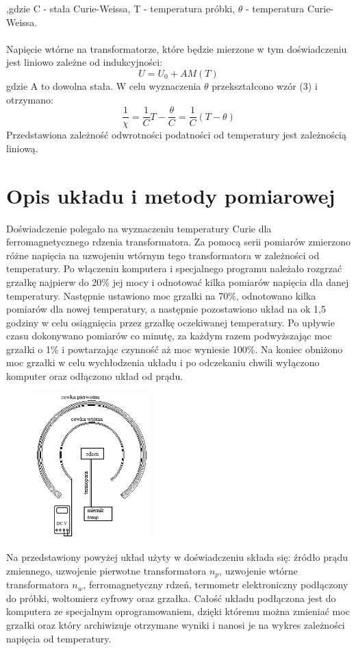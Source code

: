 \documentclass[a4paper,10pt]{article}
\begin{document}
,gdzie C - stała Curie-Weissa, T - temperatura próbki, $\theta$ - temperatura Curie-Weissa.
\\
\\Napięcie wtórne na transformatorze, które będzie mierzone w tym doświadczeniu jest liniowo zależne od indukcyjności:
\begin{equation}
U = U_0 + AM(T)
\end{equation}
gdzie A to dowolna stała. W celu wyznaczenia $\theta$ przekształcono wzór (3) i otrzymano:
\begin{equation}
\frac{1}{\chi} = \frac{1}{C} T - \frac{\theta}{C} = \frac{1}{C} (T-\theta)
\end{equation}
Przedstawiona zależność odwrotności podatności od temperatury jest zależnością liniową.

\section{Opis układu i metody pomiarowej}
Doświadczenie polegało na wyznaczeniu temperatury Curie dla ferromagnetycznego rdzenia transformatora. Za pomocą serii pomiarów zmierzono różne napięcia na uzwojeniu wtórnym tego transformatora w zależności od temperatury. Po włączeniu komputera i specjalnego programu należało rozgrzać grzałkę najpierw do 20\% jej mocy i odnotować kilka pomiarów napięcia dla danej temperatury. Następnie ustawiono moc grzałki na 70\%, odnotowano kilka pomiarów dla nowej temperatury, a następnie pozostawiono układ na ok 1,5 godziny w celu osiągnięcia przez grzałkę oczekiwanej temperatury. Po upływie czasu dokonywano pomiarów co minutę, za każdym razem podwyższając moc grzałki o 1\% i powtarzając czynność aż moc wyniesie 100\%. Na koniec obniżono moc grzałki w celu wychłodzenia układu i po odczekaniu chwili wyłączono komputer oraz odłączono układ od prądu.
\begin{figure}[H]
\center
\includegraphics[width=0.4\textwidth]{uklad.png}
\end{figure}
Na przedstawiony powyżej układ użyty w doświadczeniu składa się: źródło prądu zmiennego, uzwojenie pierwotne transformatora $n_p$, uzwojenie wtórne transformatora $n_w$, ferromagnetyczny rdzeń, termometr elektroniczny podłączony do próbki, woltomierz cyfrowy oraz grzałka. Całość układu podłączona jest do komputera ze specjalnym oprogramowaniem, dzięki któremu można zmieniać moc grzałki oraz który archiwizuje otrzymane wyniki i nanosi je na wykres zależności napięcia od temperatury.
\end{document}
